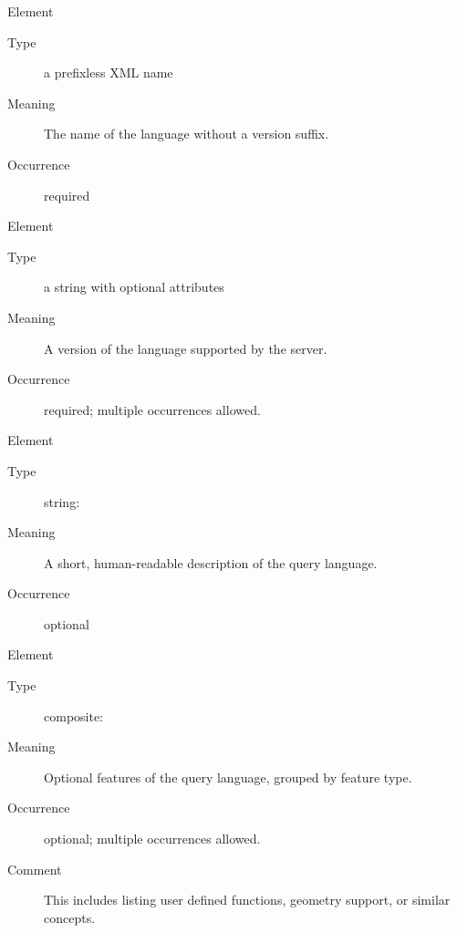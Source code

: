 \documentclass{ivoa}
\begin{document}
\begingroup\small\begin{bigdescription}\item[Element \xmlel{name}]
\begin{description}
\item[Type] a prefixless XML name
\item[Meaning] 
          The name of the language without a version suffix.
          
\item[Occurrence] required

\end{description}
\item[Element \xmlel{version}]
\begin{description}
\item[Type] a string with optional attributes
\item[Meaning] 
		    		A version of the language supported by the server.
		    	
\item[Occurrence] required; multiple occurrences allowed.

\end{description}
\item[Element \xmlel{description}]
\begin{description}
\item[Type] string: 
\item[Meaning] 
          A short, human-readable description of the
          query language.
          
\item[Occurrence] optional

\end{description}
\item[Element \xmlel{languageFeatures}]
\begin{description}
\item[Type] composite: 
\item[Meaning] 
          	Optional features of the query language, grouped by
          	feature type.
        	
\item[Occurrence] optional; multiple occurrences allowed.
\item[Comment] 
        		This includes listing user defined functions, geometry support,
        		or similar concepts.
        	

\end{description}


\end{bigdescription}\endgroup
\end{document}
